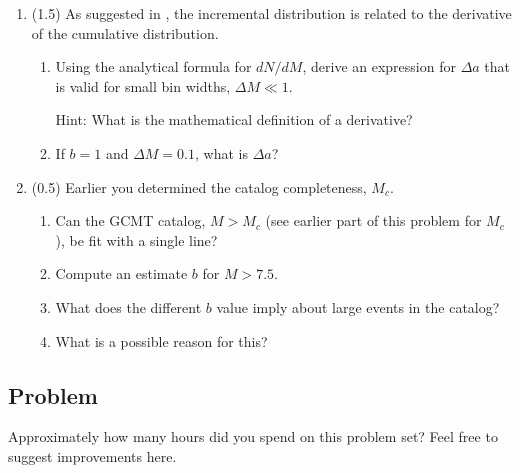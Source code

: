 \documentclass[11pt,titlepage,fleqn]{article}
\begin{document}
\begin{enumerate}
\item  (1.5) As suggested in \citet[][p.~274]{SteinWysession}, the incremental distribution is related to the derivative of the cumulative distribution. 
%
\begin{enumerate}
\item Using the analytical formula for $d N/ d M$, derive an expression for $\Delta a$ that is valid for small bin widths, $\Delta M \ll 1$.

Hint: What is the mathematical definition of a derivative?

\item If $b = 1$ and $\Delta M = 0.1$, what is $\Delta a$?

\end{enumerate}


\item (0.5) Earlier you determined the catalog completeness, $M_c$.
%
\begin{enumerate}
\item Can the GCMT catalog, $M > M_c$ (see earlier part of this problem for $M_c$), be fit with a single line?
\item Compute an estimate $b$ for $M > 7.5$.
\item What does the different $b$ value imply about large events in the catalog?
\item What is a possible reason for this?
\end{enumerate}

\end{enumerate}


\subsection*{Problem}

Approximately how many hours did you spend on this problem set? Feel free to suggest improvements here.




\end{document}
